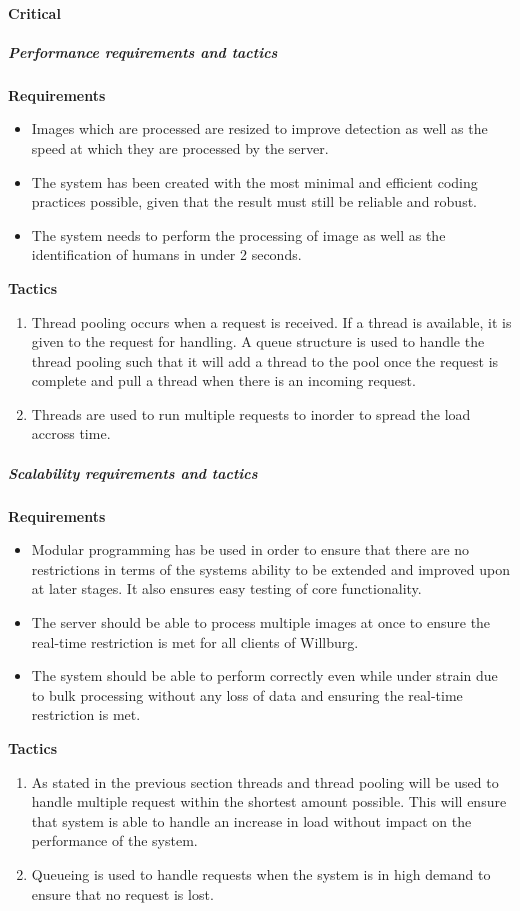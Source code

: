 \documentclass[a4paper,12pt]{report}
\begin{document}
	\paragraph {Critical}
		\subparagraph{Performance requirements and tactics}
			\hfill \break
			\hfill \break
			\textbf{Requirements}
			\begin{itemize}
				\item Images which are processed are resized to improve detection as well as the speed at which they are processed by the server.
				\item The system has been created with the most minimal and efficient coding practices possible, given that the result must still be reliable and robust.
				\item The system needs to perform the processing of image as well as the identification of humans in under 2 seconds.
			\end{itemize}
			\hfill \break
			\textbf{Tactics}
				\begin{enumerate}
					\item Thread pooling occurs when a request is received. If a thread is available, it is given to the request for handling. A queue structure is used to handle the thread pooling such that it will add a thread to the pool once the request is complete and pull a thread when there is an incoming request.
					\item Threads are used to run multiple requests to inorder to spread the load accross time.
				\end{enumerate}		
		\subparagraph{Scalability requirements and tactics}
			\hfill \break
			\hfill \break
			\textbf{Requirements}
				\begin{itemize}
					\item Modular programming has be used in order to ensure that there are no restrictions in terms of the systems ability to be extended and improved upon at later stages. It also ensures easy testing of core functionality.
					\item The server should be able to process multiple images at once to ensure the real-time restriction is met for all clients of Willburg.
					\item The system should be able to perform correctly even while under strain due to bulk processing without any loss of data and ensuring the real-time restriction is met.
				\end{itemize}
			\hfill \break	
			\textbf{Tactics}
				\begin{enumerate}
					\item As stated in the previous section threads and thread pooling will be used to handle multiple request within the shortest amount possible. This will ensure that system is able to handle an increase in load without impact on the performance of the system.
					\item Queueing is used to handle requests when the system is in high demand to ensure that no request is lost.
				\end{enumerate}
				
\end{document}

